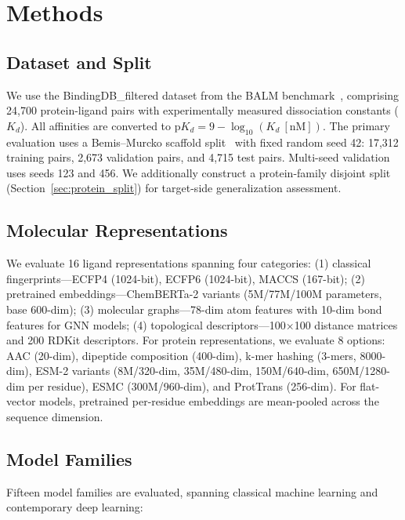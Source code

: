 \documentclass[pmlr,twocolumn]{jmlr}
\begin{document}
\section{Methods}

\subsection{Dataset and Split}

We use the BindingDB\_filtered dataset from the BALM benchmark~\citep{balm2024}, comprising 24,700 protein-ligand pairs with experimentally measured dissociation constants ($K_d$). All affinities are converted to $\text{p}K_d = 9 - \log_{10}(K_d\ [\text{nM}])$. The primary evaluation uses a Bemis--Murcko scaffold split~\citep{bemis1996murcko} with fixed random seed 42: 17,312 training pairs, 2,673 validation pairs, and 4,715 test pairs. Multi-seed validation uses seeds 123 and 456. We additionally construct a protein-family disjoint split (Section~\ref{sec:protein_split}) for target-side generalization assessment.

\subsection{Molecular Representations}

We evaluate 16 ligand representations spanning four categories: (1) classical fingerprints---ECFP4 (1024-bit), ECFP6 (1024-bit), MACCS (167-bit); (2) pretrained embeddings---ChemBERTa-2 variants (5M/77M/100M parameters, base 600-dim); (3) molecular graphs---78-dim atom features with 10-dim bond features for GNN models; (4) topological descriptors---100$\times$100 distance matrices and 200 RDKit descriptors. For protein representations, we evaluate 8 options: AAC (20-dim), dipeptide composition (400-dim), k-mer hashing (3-mers, 8000-dim), ESM-2 variants (8M/320-dim, 35M/480-dim, 150M/640-dim, 650M/1280-dim per residue), ESMC (300M/960-dim), and ProtTrans (256-dim). For flat-vector models, pretrained per-residue embeddings are mean-pooled across the sequence dimension.

\subsection{Model Families}

Fifteen model families are evaluated, spanning classical machine learning and contemporary deep learning:
\end{document}
